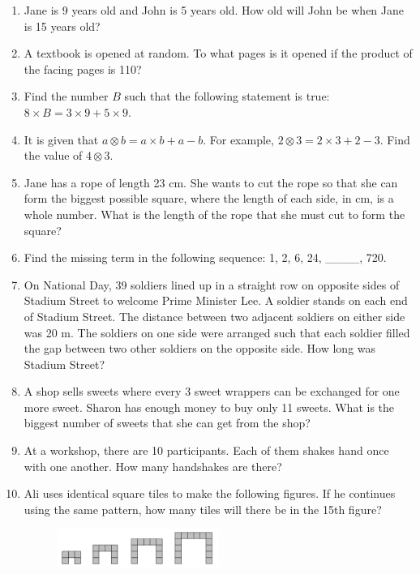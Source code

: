\documentclass[11pt]{scrartcl}
\begin{document}
\begin{enumerate}
    \item Jane is 9 years old and John is 5 years old. How old will John be when Jane is 15 years old?
    
    \item A textbook is opened at random. To what pages is it opened if the product of the facing pages is 110?
    
    \item Find the number \( B \) such that the following statement is true: \( 8 \times B = 3 \times 9 + 5 \times 9 \).
    
    \item It is given that \( a \otimes b = a \times b + a - b \). For example, \( 2 \otimes 3 = 2 \times 3 + 2 - 3 \). Find the value of \( 4 \otimes 3 \).
    
    \item Jane has a rope of length 23 cm. She wants to cut the rope so that she can form the biggest possible square, where the length of each side, in cm, is a whole number. What is the length of the rope that she must cut to form the square?
    
    \item Find the missing term in the following sequence: 1, 2, 6, 24, \_\_\_\_, 720.
    
    \item On National Day, 39 soldiers lined up in a straight row on opposite sides of Stadium Street to welcome Prime Minister Lee. A soldier stands on each end of Stadium Street. The distance between two adjacent soldiers on either side was 20 m. The soldiers on one side were arranged such that each soldier filled the gap between two other soldiers on the opposite side. How long was Stadium Street?
    
    \item A shop sells sweets where every 3 sweet wrappers can be exchanged for one more sweet. Sharon has enough money to buy only 11 sweets. What is the biggest number of sweets that she can get from the shop?
    
    \item At a workshop, there are 10 participants. Each of them shakes hand once with one another. How many handshakes are there?
    
    \item Ali uses identical square tiles to make the following figures. If he continues using the same pattern, how many tiles will there be in the 15th figure?
    \begin{figure}[h]
        \centering
        \includegraphics[width=0.5\textwidth]{Test For Pelatihan/G7-8 and G3-4/diagram.png}
    \end{figure}
    

\end{enumerate}
\end{document}
